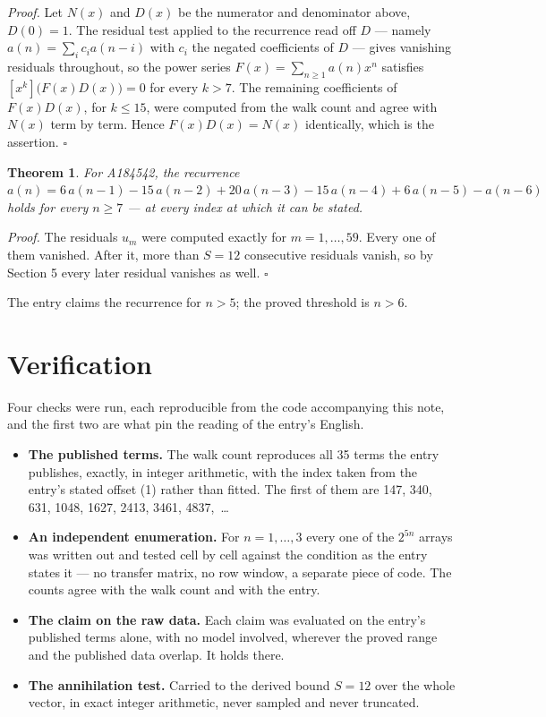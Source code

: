 \documentclass[11pt]{article}
\newtheorem{theorem}{Theorem}
\theoremstyle{definition}
\begin{document}
{\itshape Proof.} Let $N(x)$ and $D(x)$ be the numerator and denominator above, $D(0)=1$. The residual test applied to the recurrence read off $D$ --- namely $a(n) = \sum_i c_i a(n-i)$ with $c_i$ the negated coefficients of $D$ --- gives vanishing residuals throughout, so the power series $F(x)=\sum_{n\ge 1}a(n)x^n$ satisfies $[x^k]\bigl(F(x)D(x)\bigr) = 0$ for every $k > 7$. The remaining coefficients of $F(x)D(x)$, for $k \le 15$, were computed from the walk count and agree with $N(x)$ term by term. Hence $F(x)D(x) = N(x)$ identically, which is the assertion. $\square$

\begin{theorem} For A184542, the recurrence $a(n) = 6\,a(n-1) - 15\,a(n-2) + 20\,a(n-3) - 15\,a(n-4) + 6\,a(n-5) - a(n-6)$ holds for every $n \ge 7$ --- at every index at which it can be stated.\end{theorem}

{\itshape Proof.} The residuals $u_m$ were computed exactly for $m = 1,\dots,59$. Every one of them vanished. After it, more than $S = 12$ consecutive residuals vanish, so by Section 5 every later residual vanishes as well. $\square$

The entry claims the recurrence for $n > 5$; the proved threshold is $n > 6$.

\section{Verification}

Four checks were run, each reproducible from the code accompanying this note, and the first two are what pin the reading of the entry's English.

\begin{itemize}

\item {\bfseries The published terms.} The walk count reproduces all 35 terms the entry publishes, exactly, in integer arithmetic, with the index taken from the entry's stated offset (1) rather than fitted. The first of them are 147, 340, 631, 1048, 1627, 2413, 3461, 4837,~\dots

\item {\bfseries An independent enumeration.} For $n = 1,\dots,3$ every one of the $2^{5n}$ arrays was written out and tested cell by cell against the condition as the entry states it --- no transfer matrix, no row window, a separate piece of code. The counts agree with the walk count and with the entry.

\item {\bfseries The claim on the raw data.} Each claim was evaluated on the entry's published terms alone, with no model involved, wherever the proved range and the published data overlap. It holds there.

\item {\bfseries The annihilation test.} Carried to the derived bound $S = 12$ over the whole vector, in exact integer arithmetic, never sampled and never truncated.

\end{itemize}
\end{document}
